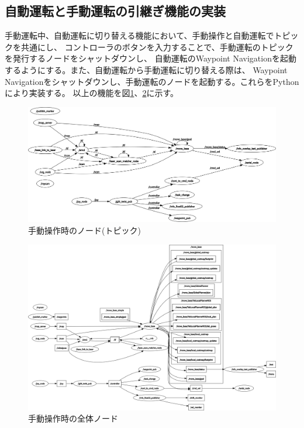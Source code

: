 \subsection{自動運転と手動運転の引継ぎ機能の実装}
手動運転中、自動運転に切り替える機能において、手動操作と自動運転でトピックを共通にし、
コントローラのボタンを入力することで、手動運転のトピックを発行するノードをシャットダウンし、
自動運転のWaypoint Navigationを起動するようにする。また、自動運転から手動運転に切り替える際は、
Waypoint Navigationをシャットダウンし、手動運転のノードを起動する。これらをPythonにより実装する。
以上の機能を図\ref{auto:change_node}、\ref{auto:change_node2}に示す。

\begin{figure}[h]
  \begin{center}
    \includegraphics[width=\linewidth]{img/auto_45.png}
    \caption{手動操作時のノード(トピック)}
    \label{auto:change_node}
  \end{center}
\end{figure}

\begin{figure}[h]
  \begin{center}
    \includegraphics[width=\linewidth]{img/auto_46.png}
    \caption{手動操作時の全体ノード}
    \label{auto:change_node2}
  \end{center}
\end{figure}

